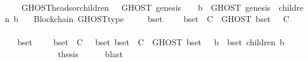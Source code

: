 \begin{isabellebody}
\ \ \isanewline
\ \ \ \ {\isachardoublequoteopen}GHOST{\isacharunderscore}heads{\isacharunderscore}or{\isacharunderscore}children\ {\isasymsigma}\ {\isacharequal}\ GHOST\ {\isacharparenleft}{\isacharbraceleft}genesis{\isacharbraceright}{\isacharcomma}\ {\isasymsigma}{\isacharparenright}\ {\isasymunion}\ {\isacharparenleft}{\isasymUnion}\ b\ {\isasymin}\ GHOST\ {\isacharparenleft}{\isacharbraceleft}genesis{\isacharbraceright}{\isacharcomma}\ {\isasymsigma}{\isacharparenright}{\isachardot}\ children\ {\isacharparenleft}b{\isacharcomma}\ {\isasymsigma}{\isacharparenright}{\isacharparenright}{\isachardoublequoteclose}\isanewline
\isanewline
{}\isamarkupfalse%
\ {\isacharparenleft}\ Blockchain{\isacharparenright}\ GHOST{\isacharunderscore}type\ {\isacharcolon}\isanewline
\ \ {\isachardoublequoteopen}{\isasymforall}\ {\isasymsigma}\ b{\isacharunderscore}set{\isachardot}\ {\isasymsigma}\ {\isasymin}\ {\isasymSigma}\ {\isasymand}\ b{\isacharunderscore}set\ {\isasymsubseteq}\ C\ {\isasymlongrightarrow}\ GHOST\ {\isacharparenleft}b{\isacharunderscore}set{\isacharcomma}\ {\isasymsigma}{\isacharparenright}\ {\isasymsubseteq}\ C{\isachardoublequoteclose}\isanewline
%
\isadelimproof
%
\endisadelimproof
%
\isatagproof
{}\isamarkupfalse%
\ {\isacharminus}\ \isanewline
\ \ \isanewline
\ \ \isamarkupfalse%
\ {\isachardoublequoteopen}{\isasymforall}\ {\isasymsigma}\ b{\isacharunderscore}set{\isachardot}\ {\isasymsigma}\ {\isasymin}\ {\isasymSigma}\ {\isasymand}\ b{\isacharunderscore}set\ {\isasymsubseteq}\ C\ {\isasymlongrightarrow}\ {\isacharparenleft}{\isasymexists}\ b{\isacharunderscore}set{\isacharprime}{\isachardot}\ b{\isacharunderscore}set{\isacharprime}\ {\isasymsubseteq}\ C\ {\isasymand}\ GHOST\ {\isacharparenleft}b{\isacharunderscore}set{\isacharcomma}\ {\isasymsigma}{\isacharparenright}\ {\isacharequal}\ {\isacharbraceleft}b\ {\isasymin}\ b{\isacharunderscore}set{\isacharprime}{\isachardot}\ children\ {\isacharparenleft}b{\isacharcomma}\ {\isasymsigma}{\isacharparenright}\ {\isacharequal}\ {\isasymemptyset}{\isacharbraceright}{\isacharparenright}{\isachardoublequoteclose}\ \ \ \ \isanewline
\ \ \ \ \isamarkupfalse%
\isanewline
\ \ \isamarkupfalse%
\ \isamarkupfalse%
\ {\isacharquery}thesis\isanewline
\ \ \ \ \isamarkupfalse%
\ blast\isanewline
{}\isamarkupfalse%
%
\endisatagproof
{\isafoldproof}%
%
\isadelimproof
\ \ \ \ \isanewline
%
\endisadelimproof
\isanewline
\isanewline
{}\isamarkupfalse%

\end{isabellebody}
